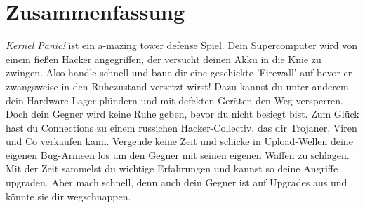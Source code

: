 \section{Zusammenfassung}


\textit{Kernel Panic!} ist ein a-mazing tower defense Spiel.
Dein Supercomputer wird von einem fießen Hacker angegriffen, der versucht deinen Akku in die Knie zu zwingen.
Also handle schnell und baue dir eine geschickte 'Firewall' auf bevor er zwangsweise in den Ruhezustand versetzt wirst!
Dazu kannst du unter anderem dein Hardware-Lager plündern und mit defekten Geräten den Weg versperren.
Doch dein Gegner wird keine Ruhe geben, bevor du nicht besiegt bist.
Zum Glück hast du Connections zu einem russichen Hacker-Collectiv, das dir Trojaner, Viren und Co verkaufen kann. Vergeude keine Zeit und schicke in Upload-Wellen deine eigenen Bug-Armeen los um den Gegner mit seinen eigenen Waffen zu schlagen.
Mit der Zeit sammelst du wichtige Erfahrungen und kannst so deine Angriffe upgraden. Aber mach schnell, denn auch dein Gegner ist auf Upgrades aus und könnte sie dir wegschnappen.
